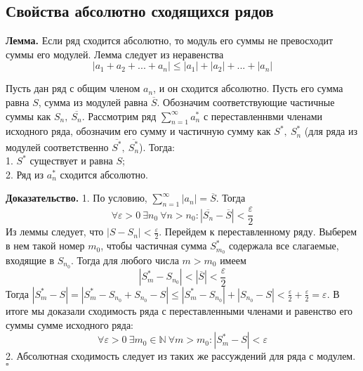 \subsection{Свойства абсолютно сходящихся рядов}
\textbf{Лемма.} Если ряд сходится абсолютно, то модуль его суммы не 
превосходит суммы его модулей. Лемма следует из неравенства
$$\left| a_1+a_2+...+a_n \right|\leqslant |a_1|+|a_2|+...+|a_n|$$
\begin{theor}
    Пусть дан ряд с общим членом $a_n$, и он сходится абсолютно.
    Пусть его сумма равна $S$, сумма из модулей равна $\overline{S}$. 
    Обозначим соответствующие частичные суммы как $S_n,~\overline{S_n}$.
    Рассмотрим ряд $\sum\limits_{n=1}^{\infty} a^*_n$ с переставленнвми
    членами исходного ряда, обозначим его сумму
    и частичную сумму как $S^*,~S^*_n$ (для ряда из модулей соответственно
    $\overline{S^*},~\overline{S^*_n}$). Тогда:\\
    1. $S^*$ существует и равна  $S$;\\
    2. Ряд из  $a^*_n$ сходится абсолютно.
    \end{theor}
\textbf{Доказательство.} 1.  
По условию, $\sum\limits_{n=1}^{\infty} |a_n|=\overline{S}$. Тогда
$$\forall \varepsilon>0~\exists n_0~\forall n>n_0:|\overline{S_n}-
\overline{S}|<\frac{\varepsilon}{2}$$ 
Из леммы следует, что $|S-S_n|<\frac{\varepsilon}{2}$. 
Перейдем к переставленному ряду. Выберем в нем такой номер $m_0$, 
чтобы частичная сумма $S^*_{m_0}$ содержала все слагаемые, входящие в 
$S_{n_0}$. Тогда для любого числа $m>m_0$ имеем
$$|S^*_{m}-S_{n_0}|<|\overline{S}|<\frac{\varepsilon}{2}$$
Тогда $|S^*_m-S|=|S^*_m-S_{n_0}+S_{n_0}-S|\leqslant 
|S^*_m-S_{n_0}|+|S_{n_0}-S|<\frac{\varepsilon}{2}+\frac{\varepsilon}{2}=
\varepsilon$. 
В итоге мы доказали сходимость ряда с переставленными членами и равенство 
его суммы сумме исходного ряда:
$$\forall \varepsilon>0~\exists m_0\in\mathbb{N}~\forall m>m_0:|S^*_m-S|
<\varepsilon$$ 
2. Абсолютная сходимость следует из таких же рассуждений для ряда с модулем. 
$\square$ 
